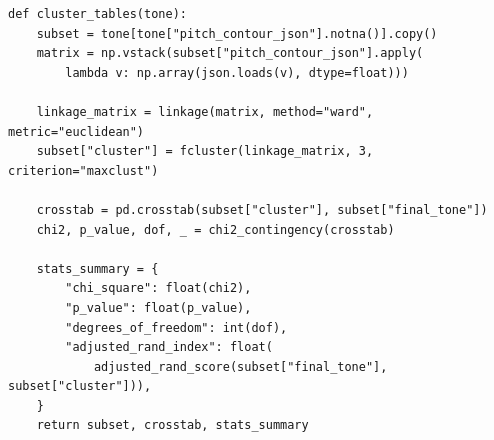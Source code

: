 \begin{lstlisting}[caption={基频轮廓的层次聚类与一致性检验},label={lst:toneclus}]
def cluster_tables(tone):
    subset = tone[tone["pitch_contour_json"].notna()].copy()
    matrix = np.vstack(subset["pitch_contour_json"].apply(
        lambda v: np.array(json.loads(v), dtype=float)))

    linkage_matrix = linkage(matrix, method="ward", metric="euclidean")
    subset["cluster"] = fcluster(linkage_matrix, 3, criterion="maxclust")

    crosstab = pd.crosstab(subset["cluster"], subset["final_tone"])
    chi2, p_value, dof, _ = chi2_contingency(crosstab)

    stats_summary = {
        "chi_square": float(chi2),
        "p_value": float(p_value),
        "degrees_of_freedom": int(dof),
        "adjusted_rand_index": float(
            adjusted_rand_score(subset["final_tone"], subset["cluster"])),
    }
    return subset, crosstab, stats_summary
\end{lstlisting}